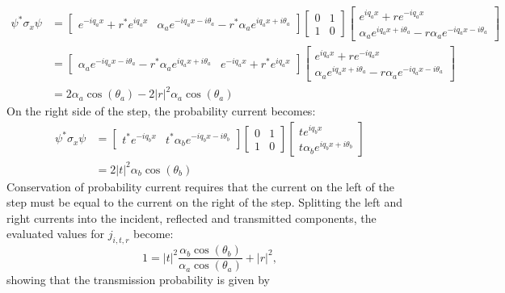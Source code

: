 		\begin{align}
			\psi^{*} \sigma_{x} \psi&=
			\left[\begin{array}{ccc}
				e^{-iq_{a}x}+r^{*}e^{iq_{a}x}&\alpha_{a}e^{-iq_{a}x-i\theta_{a}}-r^{*}\alpha_{a}e^{iq_{a}x+i\theta_{a}}
			\end{array}\right]
			\left[\begin{array}{ccc}
				0&1\\
				1&0
			\end{array}\right]
			\left[\begin{array}{ccc}
				e^{iq_{a}x}+re^{-iq_{a}x}\\
				\alpha_{a}e^{iq_{a}x+i\theta_{a}}-r\alpha_{a}e^{-iq_{a}x-i\theta_{a}}
			\end{array}\right]\\
			&=
			\left[\begin{array}{ccc}
				\alpha_{a}e^{-iq_{a}x-i\theta_{a}}-r^{*}\alpha_{a}e^{iq_{a}x+i\theta_{a}}&e^{-iq_{a}x}+r^{*}e^{iq_{a}x}
			\end{array}\right]
			\left[\begin{array}{ccc}
				e^{iq_{a}x}+re^{-iq_{a}x}\\
				\alpha_{a}e^{iq_{a}x+i\theta_{a}}-r\alpha_{a}e^{-iq_{a}x-i\theta_{a}}
			\end{array}\right]\\
			&=
			2\alpha_{a}\cos(\theta_{a})-2|r|^{2}\alpha_{a}\cos(\theta_{a})
		\end{align}
		On the right side of the step, the probability current becomes:
		\begin{align}
			\psi^{*} \sigma_{x} \psi&=
			\left[\begin{array}{ccc}
				t^{*}e^{-iq_{b}x}&t^{*}\alpha_{b}e^{-iq_{b}x-i\theta_{b}}
			\end{array}\right]
			\left[\begin{array}{ccc}
				0&1\\
				1&0
			\end{array}\right]
			\left[\begin{array}{ccc}
				te^{iq_{b}x}\\
				t\alpha_{b}e^{iq_{b}x+i\theta_{b}}
			\end{array}\right]\\
			&=
			2|t|^{2}\alpha_{b}\cos(\theta_{b})
		\end{align}
		Conservation of probability current requires that the current on the left of the step must be equal to the current on the right of the step. Splitting the left and right currents into the incident, reflected and transmitted components, the evaluated values for $j_{i,t,r}$ become:
		\begin{equation}
			1=|t|^{2}\frac{\alpha_{b}\cos(\theta_{b})}{\alpha_{a}\cos(\theta_{a})}+|r|^{2},
		\end{equation}
		showing that the transmission probability is given by 
		
